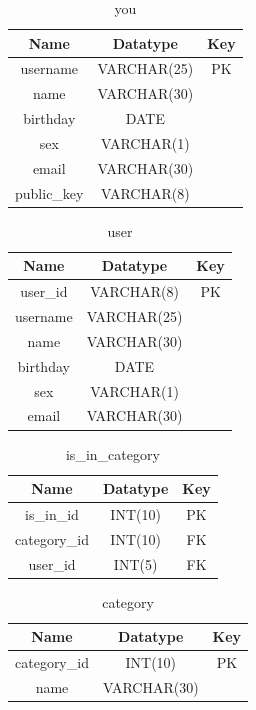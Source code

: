 \begin{table}[!ht]
\caption{you}
\centering
\begin{tabular}{c c c}
\hline\hline
Name               & Datatype    & Key \\
\hline
username           & VARCHAR(25) & PK   \\
name               & VARCHAR(30) &      \\
birthday           & DATE        &      \\
sex                & VARCHAR(1)  &      \\
email              & VARCHAR(30) &      \\
public\_key        & VARCHAR(8)  &      \\
\hline
\end{tabular}
\label{table:nonlin}
\end{table}

\begin{table}[!ht]
\caption{user}
\centering
\begin{tabular}{c c c}
\hline\hline
Name               & Datatype    & Key \\
\hline
user\_id           & VARCHAR(8)  & PK \\  %
username           & VARCHAR(25) &    \\
name               & VARCHAR(30) &    \\
birthday           & DATE        &    \\
sex                & VARCHAR(1)  &    \\
email              & VARCHAR(30) &    \\
\hline
\end{tabular}
\label{table:nonlin}
\end{table}

\begin{table}[!ht]
\caption{is\_in\_category}
\centering
\begin{tabular}{c c c}
\hline\hline
Name               & Datatype    & Key \\
\hline
is\_in\_id         & INT(10)     & PK   \\
category\_id       & INT(10)     & FK   \\
user\_id           & INT(5)      & FK   \\
\hline
\end{tabular}
\label{table:nonlin}
\end{table}

\begin{table}[!ht]
\caption{category}
\centering
\begin{tabular}{c c c}
\hline\hline
Name               & Datatype    & Key \\
\hline
category\_id       & INT(10)     & PK  \\
name               & VARCHAR(30) &     \\
\hline
\end{tabular}
\label{table:nonlin}
\end{table}



